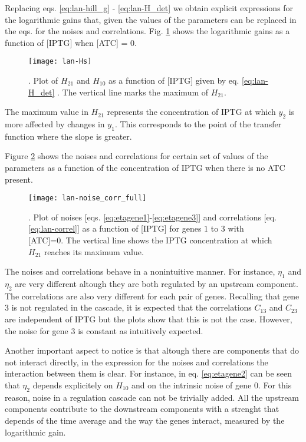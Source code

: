 Replacing eqs. \eqref{eq:lan-hill_g} - \eqref{eq:lan-H_det} we obtain explicit expressions for the logarithmic gains that, given the values of the parameters can be replaced in the eqs. for the noises and correlations. Fig. \ref{fig:lan-Hs} shows the logarithmic gains as a function of [IPTG] when [ATC] = 0.
\begin{figure}[H]
  \centering
  \texttt{[image: lan-Hs]}
  \caption[Logarithmic gains for the genes of a cascade of regulation]{\label{fig:lan-Hs}. Plot of $H_{21}$ and $H_{10}$ as a function of [IPTG] given by eq. \eqref{eq:lan-H_det} . The vertical line marks the maximum of $H_{21}$.}
\end{figure}

The maximum value in $H_{21}$ represents the concentration of IPTG at which $y_2$ is more affected by changes in $y_1$. This corresponds to the point of the transfer function where the slope is greater.

Figure \ref{fig:lan-noise_corr_full} shows the noises and correlations for certain set of values of the parameters as a function of the concentration of IPTG when there is no ATC present.
\begin{figure}[H]
  \centering
  \texttt{[image: lan-noise\_corr\_full]}
  \caption[Noises and correlation for the genes of a cascade of regulation]{\label{fig:lan-noise_corr_full}. Plot of noises [eqs. \eqref{eq:etagene1}-\eqref{eq:etagene3}] and correlations [eq. \eqref{eq:lan-correl}] as a function of [IPTG] for genes $1$ to $3$ with [ATC]=0. The vertical line shows the IPTG concentration at which $H_{21}$ reaches its maximum value.}
\end{figure}

The noises and correlations behave in a nonintuitive manner. For instance, $\eta_1$ and $\eta_2$ are very different altough they are both regulated by an upstream component. The correlations are also very different for each pair of genes. Recalling that gene $3$ is not regulated in the cascade, it is expected that the correlations $C_{13}$ and $C_{23}$ are independent of IPTG but the plots show that this is not the case. However, the noise for gene $3$ is constant as intuitively expected.

Another important aspect to notice is that altough there are components that do not interact directly, in the expression for the noises and correlations the interaction between them is clear. For instance, in eq. \eqref{eq:etagene2} can be seen that $\eta_2$ depends explicitely on $H_{10}$ and on the intrinsic noise of gene $0$. For this reason, noise in a regulation cascade can not be trivially added. All the upstream components contribute to the downstream components with a strenght that depends of the time average and the way the genes interact, measured by the logarithmic gain.

